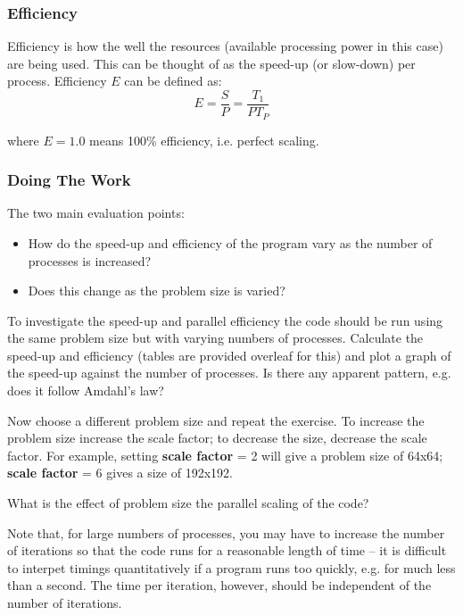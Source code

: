 \documentclass{article}
\begin{document}
\subsubsection{Efficiency}

Efficiency is how the well the resources (available processing power in
this case) are being used. This can be thought of as the speed-up (or
slow-down) per process. Efficiency $E$ can be defined as:
\begin{equation}
E = \frac{S}{P} =  \frac{T_1}{P T_P}
\end{equation}

where $E = 1.0$ means 100\% efficiency, i.e. perfect scaling.

\subsubsection{Doing The Work}

The two main evaluation points:
\begin{itemize}

\item How do the speed-up and efficiency of the program vary as the
  number of processes is increased?

\item Does this change as the problem size is varied? 

\end{itemize}

To investigate the speed-up and parallel efficiency the code should be
run using the same problem size but with varying numbers of
processes. Calculate the speed-up and efficiency (tables are provided
overleaf for this) and plot a graph of the speed-up against the number
of processes. Is there any apparent pattern, e.g. does it follow
Amdahl's law?

Now choose a different problem size and repeat the exercise. To
increase the problem size increase the scale factor; to decrease the
size, decrease the scale factor. For example, setting \textbf{scale
  factor} = 2 will give a problem size of 64x64; \textbf{scale factor}
= 6 gives a size of 192x192.

What is the effect of problem size the parallel scaling of the code?

Note that, for large numbers of processes, you may have to increase
the number of iterations so that the code runs for a reasonable length
of time -- it is difficult to interpet timings quantitatively if a
program runs too quickly, e.g. for much less than a second. The time
per iteration, however, should be independent of the number of
iterations.
\end{document}
